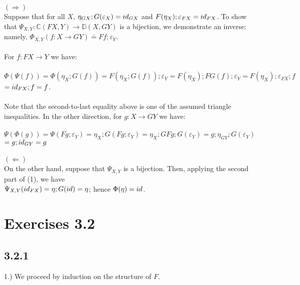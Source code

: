\documentclass{article}
\begin{document}
$(\Rightarrow)$\\
Suppose that for all $X$, $\eta_{GX};G(\varepsilon_X) = \mit{id}_{GX}$ and
$F(\eta_X);\varepsilon_{FX} = \mit{id}_{FX}$.
To show that $\Psi_{X,Y} : \mathbb C(FX, Y) \to \mathbb D(X, GY)$ is a bijection, we demonstrate 
an inverse: namely, $\Phi_{X,Y}(f : X \to GY) \doteq Ff;\varepsilon_{Y}$.\\~\\
For $f : FX \to Y$ we have:\\~\\
$\Phi(\Psi(f)) = \Phi(\eta_X;G(f)) = F(\eta_X;G(f));\varepsilon_{Y} = F(\eta_X);FG(f);\varepsilon_Y
 = F(\eta_X);\varepsilon_{FX};f$\\
$= \mit{id}_{FX};f = f$.\\~\\
Note that the second-to-last equality above is one of the assumed triangle inequalities.
In the other direction, for $g : X \to GY$ we have:\\~\\
$\Psi(\Phi(g)) = \Psi(Fg;\varepsilon_Y) = \eta_X;G(Fg;\varepsilon_Y) = \eta_X;GFg;G(\varepsilon_Y) = g;\eta_{GY};G(\varepsilon_Y)$\\
$= g;\mit{id}_{GY} = g$\\~\\
$(\Leftarrow)$\\
On the other hand, suppose that $\Psi_{X,Y}$ is a bijection. Then, applying the second part of (1), we have\\
$\Psi_{X,Y}(\mit{id}_{FX}) = \eta;G(\mit{id}) = \eta$; hence $\Phi(\eta) = \mit{id}$. 




\section*{Exercises 3.2}

\subsection*{3.2.1}

1.) We proceed by induction on the structure of $F$.
\end{document}
